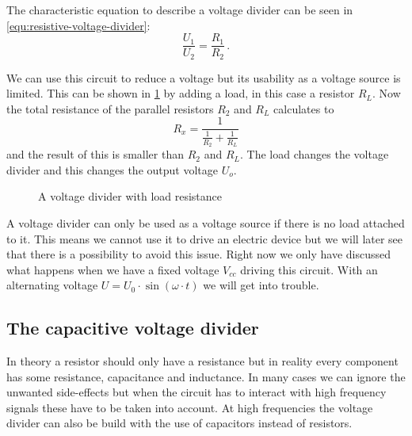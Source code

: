 The characteristic equation to describe a voltage divider can be seen in \cref{equ:resistive-voltage-divider}:
\begin{equation}
	\frac{U_1}{U_2} = \frac{R_1}{R_2}\,.
	\label{equ:resistive-voltage-divider}
\end{equation}

We can use this circuit to reduce a voltage but its usability as a voltage source is limited. This can be shown in \cref{fig:loaded-voltage-divider} by adding a load, in this case a resistor $R_L$. Now the total resistance of the parallel resistors $R_2$ and $R_L$ calculates to
\begin{equation*}
	R_x = \frac{1}{\frac{1}{R_2} + \frac{1}{R_L}}
\end{equation*}
and the result of this is smaller than $R_2$ and $R_L$. The load changes the voltage divider and this changes the output voltage $U_o$.


\begin{figure}[htb]
	\centering
	\caption{A voltage divider with load resistance}
	\label{fig:loaded-voltage-divider}
\end{figure}

A voltage divider can only be used as a voltage source if there is no load attached to it. This means we cannot use it to drive an electric device but we will later see that there is a possibility to avoid this issue. Right now we only have discussed what happens when we have a fixed voltage $V_{cc}$ driving this circuit. With an alternating voltage $U = U_0 \cdot \sin(\omega \cdot t)$ we will get into trouble.

\subsection{The capacitive voltage divider}

In theory a resistor should only have a resistance but in reality every component has some resistance, capacitance and inductance. In many cases we can ignore the unwanted side-effects but when the circuit has to interact with high frequency signals these have to be taken into account. At high frequencies the voltage divider can also be build with the use of capacitors instead of resistors.

